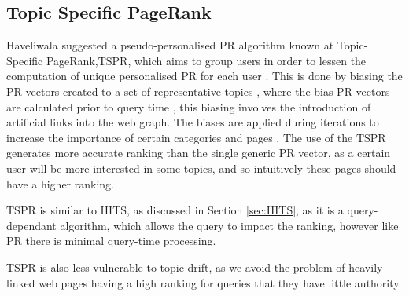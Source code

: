 \documentclass[11pt]{report}
\begin{document}
{\subsection{Topic Specific PageRank} \label{sec:Topic specific PR}
Haveliwala suggested a pseudo-personalised PR algorithm known at Topic-Specific PageRank,TSPR, which aims to group users in order to lessen the computation of unique personalised PR for each user \cite{haveliwala2002topic}. This is done by biasing the PR vectors created to a set of representative topics \cite{haveliwala2002topic}, where the bias PR vectors are calculated prior to query time \cite{langville}, this biasing involves the introduction of artificial links into the web graph. The biases are applied during iterations to increase the importance of certain categories and pages \cite{haveliwala1999efficient}. The use of the TSPR generates more accurate ranking than the single generic PR vector, as a certain user will be more interested in some topics, and so intuitively these pages should have a higher ranking. 

TSPR is similar to HITS, as discussed in Section \ref{sec:HITS}, as it is a query-dependant algorithm, which allows the query to impact the ranking, however like PR there is minimal query-time processing. 

TSPR is also less vulnerable to topic drift, as we avoid the problem of heavily linked web pages having a high ranking for queries that they have little authority. 

}
\end{document}
